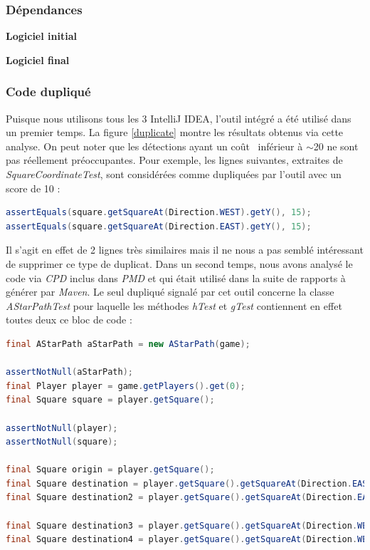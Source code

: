 \documentclass[12pt, openany]{report}
\begin{document}
\subsubsection*{Dépendances}
\textbf{Logiciel initial}

\textbf{Logiciel final}






\subsubsection{Code dupliqué}
Puisque nous utilisons tous les 3 IntelliJ IDEA, l'outil intégré a été utilisé dans un premier temps. La figure \ref{duplicate} montre les résultats obtenus via cette analyse.
On peut noter que les détections ayant un \og coût \fg \, inférieur à $\sim$20 ne sont pas réellement préoccupantes. Pour exemple, les lignes suivantes, extraites de \textit{SquareCoordinateTest}, sont considérées comme dupliquées par l'outil avec un score de 10 :
\begin{lstlisting}[language=java]
assertEquals(square.getSquareAt(Direction.WEST).getY(), 15);
assertEquals(square.getSquareAt(Direction.EAST).getY(), 15);
\end{lstlisting}
Il s'agit en effet de 2 lignes très similaires mais il ne nous a pas semblé intéressant de supprimer ce type de duplicat. 
Dans un second temps, nous avons analysé le code via \textit{CPD} inclus dans \textit{PMD} et qui était utilisé dans la suite de rapports à générer par \textit{Maven}. Le seul dupliqué signalé par cet outil concerne la classe \textit{AStarPathTest} pour laquelle les méthodes \textit{hTest} et \textit{gTest} contiennent en effet toutes deux ce bloc de code :
\begin{lstlisting}[language=java]
final AStarPath aStarPath = new AStarPath(game);

assertNotNull(aStarPath);
final Player player = game.getPlayers().get(0);
final Square square = player.getSquare();

assertNotNull(player);
assertNotNull(square);

final Square origin = player.getSquare();
final Square destination = player.getSquare().getSquareAt(Direction.EAST);
final Square destination2 = player.getSquare().getSquareAt(Direction.EAST).getSquareAt(Direction.EAST);

final Square destination3 = player.getSquare().getSquareAt(Direction.WEST);
final Square destination4 = player.getSquare().getSquareAt(Direction.WEST).getSquareAt(Direction.WEST);
\end{lstlisting}
\end{document}
